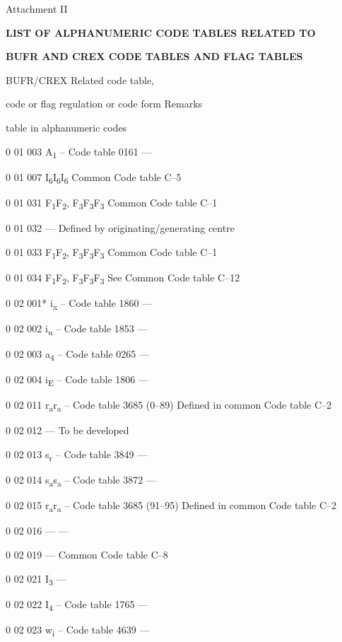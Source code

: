 Attachment II

\textbf{LIST OF ALPHANUMERIC CODE TABLES RELATED TO}

\textbf{BUFR AND CREX CODE TABLES AND FLAG TABLES}

BUFR/CREX Related code table,

code or flag regulation or code form Remarks

table in alphanumeric codes

0 01 003 A\textsubscript{1} -- Code table 0161 ---

0 01 007 I\textsubscript{6}I\textsubscript{6}I\textsubscript{6} Common Code table C--5

0 01 031 F\textsubscript{1}F\textsubscript{2}, F\textsubscript{3}F\textsubscript{3}F\textsubscript{3} Common Code table C--1

0 01 032 --- Defined by originating/generating centre

0 01 033 F\textsubscript{1}F\textsubscript{2}, F\textsubscript{3}F\textsubscript{3}F\textsubscript{3} Common Code table C--1

0 01 034 F\textsubscript{1}F\textsubscript{2}, F\textsubscript{3}F\textsubscript{3}F\textsubscript{3} See Common Code table C--12

0 02 001* i\textsubscript{x} -- Code table 1860 ---

0 02 002 i\textsubscript{u} -- Code table 1853 ---

0 02 003 a\textsubscript{4} -- Code table 0265 ---

0 02 004 i\textsubscript{E} -- Code table 1806 ---

0 02 011 r\textsubscript{a}r\textsubscript{a} -- Code table 3685 (0--89) Defined in common Code table C--2

0 02 012 --- To be developed

0 02 013 s\textsubscript{r} -- Code table 3849 ---

0 02 014 s\textsubscript{a}s\textsubscript{a} -- Code table 3872 ---

0 02 015 r\textsubscript{a}r\textsubscript{a} -- Code table 3685 (91--95) Defined in common Code table C--2

0 02 016 --- ---

0 02 019 --- Common Code table C--8

0 02 021 I\textsubscript{3} ---

0 02 022 I\textsubscript{4} -- Code table 1765 ---

0 02 023 w\textsubscript{i} -- Code table 4639 ---

